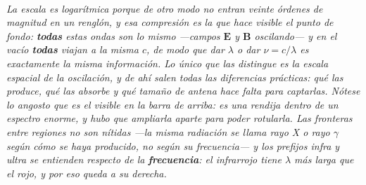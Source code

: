 \begin{center}
\begin{tikzpicture}[scale=1]
\end{tikzpicture}\\[0.5em]
{\small\itshape La escala es logarítmica porque de otro modo no entran veinte
órdenes de magnitud en un renglón, y esa compresión es la que hace visible el
punto de fondo: \textbf{todas} estas ondas son lo mismo ---campos $\mathbf{E}$ y
$\mathbf{B}$ oscilando--- y en el vacío \textbf{todas} viajan a la misma $c$, de
modo que dar $\lambda$ o dar $\nu = c/\lambda$ es exactamente la misma
información. Lo único que las distingue es la escala espacial de la oscilación, y
de ahí salen todas las diferencias prácticas: qué las produce, qué las absorbe y
qué tamaño de antena hace falta para captarlas. Nótese lo angosto que es el
visible en la barra de arriba: es una rendija dentro de un espectro enorme, y
hubo que ampliarla aparte para poder rotularla. Las fronteras entre regiones no
son nítidas ---la misma radiación se llama rayo X o rayo $\gamma$ según cómo se
haya producido, no según su frecuencia--- y los prefijos \emph{infra} y
\emph{ultra} se entienden respecto de la \textbf{frecuencia}: el infrarrojo tiene
$\lambda$ más larga que el rojo, y por eso queda a su derecha.}
\end{center}
